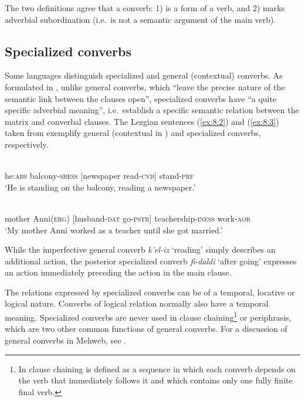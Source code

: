 ﻿\documentclass[output=paper]{langsci/langscibook}
\begin{document}
The two definitions agree that a converb: 1) is a form of a verb, and 2)
marks adverbial subordination (i.e.\ is not a semantic argument of the
main verb).

\subsection{Specialized converbs}\label{specialized-converbs}

Some languages distinguish specialized and general (contextual)
converbs. As formulated in \citet{haspelmath1995b}, unlike general converbs,
which ``leave the precise nature of the semantic link between the
clauses open'', specialized converbs have ``a quite specific adverbial
meaning'', i.e.\ establish a specific semantic relation between the
matrix and converbal clauses. The Lezgian sentences (\ref{ex:8:2}) and (\ref{ex:8:3}) taken
from \citet{haspelmath1995b} exemplify general (contextual
in \citealt{haspelmath1995b}) and specialized converbs, respectively.

\ea \label{ex:8:2} %
\\
he:\textsc{abs} balcony-\textsc{sbess} [newspaper read-\textsc{cvb}] stand-\textsc{prf}\\
\glt `He is standing on the balcony, reading a newspaper.'

\ex \label{ex:8:3} %
\\
mother Anni(\textsc{erg}) [husband-\textsc{dat} go-\textsc{pstr}] teachership-\textsc{iness} work-\textsc{aor}\\
\glt `My mother Anni worked as a teacher until she got married.'
\z

While the imperfective general converb \emph{k'el-iz} `reading' simply
describes an additional action, the posterior specialized converb
\emph{fi-daldi} `after going' expresses an action immediately preceding
the action in the main clause.

The relations expressed by specialized converbs can be of a temporal,
locative or logical nature. Converbs of logical relation
normally also have a temporal meaning. Specialized converbs are never
used in clause chaining\footnote{In \citet{haspelmath1995a} clause
  chaining is defined as a sequence in which each converb depends on the
  verb that immediately follows it and which contains only one fully
  finite final verb.} or periphrasis, which are two other common
functions of general converbs. For a discussion of general converbs in
Mehweb, see \citet{kustova2019}.
\end{document}
